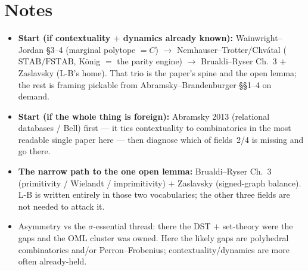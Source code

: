 \section{Notes}

\begin{itemize}[itemsep=2pt]
  \item \textbf{Start (if contextuality $+$ dynamics already known):}
    Wainwright--Jordan \S3--4 (marginal polytope $=C$) $\to$
    Nemhauser--Trotter/Chv\'atal ($\mathrm{STAB}/\mathrm{FSTAB}$, K\"onig $=$ the
    parity engine) $\to$ Brualdi--Ryser Ch.~3 $+$ Zaslavsky (L-B's home). That trio
    is the paper's spine and the open lemma; the rest is framing pickable from
    Abramsky--Brandenburger \S\S1--4 on demand.
  \item \textbf{Start (if the whole thing is foreign):} Abramsky 2013 (relational
    databases / Bell) first --- it ties contextuality to combinatorics in the most
    readable single paper here --- then diagnose which of fields~2/4 is missing and
    go there.
  \item \textbf{The narrow path to the one open lemma:} Brualdi--Ryser Ch.~3
    (primitivity / Wielandt / imprimitivity) $+$ Zaslavsky (signed-graph balance).
    L-B is written entirely in those two vocabularies; the other three fields are
    not needed to attack it.
  \item Asymmetry vs the $\sigma$-essential thread: there the DST $+$ set-theory
    were the gaps and the OML cluster was owned. Here the likely gaps are polyhedral
    combinatorics and/or Perron--Frobenius; contextuality/dynamics are more often
    already-held.
\end{itemize}
